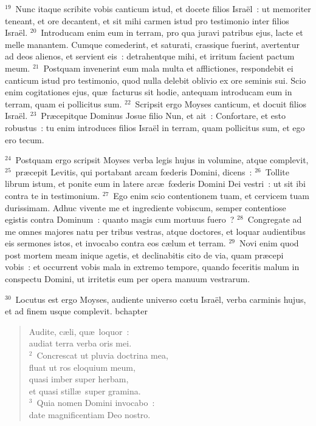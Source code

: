 ${}^{19}$~Nunc itaque scribite vobis canticum istud, et docete filios Isra\"el~: ut memoriter teneant, et ore decantent, et sit mihi carmen istud pro testimonio inter filios Isra\"el.
${}^{20}$~Introducam enim eum in terram, pro qua juravi patribus ejus, lacte et melle manantem. Cumque comederint, et saturati, crassique fuerint, avertentur ad deos alienos, et servient eis~: detrahentque mihi, et irritum facient pactum meum.
${}^{21}$~Postquam invenerint eum mala multa et afflictiones, respondebit ei canticum istud pro testimonio, quod nulla delebit oblivio ex ore seminis sui. Scio enim cogitationes ejus, qu\ae\ facturus sit hodie, antequam introducam eum in terram, quam ei pollicitus sum.
${}^{22}$~Scripsit ergo Moyses canticum, et docuit filios Isra\"el.
${}^{23}$~Pr\ae cepitque Dominus Josue filio Nun, et ait~: Confortare, et esto robustus~: tu enim introduces filios Isra\"el in terram, quam pollicitus sum, et ego ero tecum.


${}^{24}$~Postquam ergo scripsit Moyses verba legis hujus in volumine, atque complevit,
${}^{25}$~pr\ae cepit Levitis, qui portabant arcam fœderis Domini, dicens~:
${}^{26}$~Tollite librum istum, et ponite eum in latere arc\ae\ fœderis Domini Dei vestri~: ut sit ibi contra te in testimonium.
${}^{27}$~Ego enim scio contentionem tuam, et cervicem tuam durissimam. Adhuc vivente me et ingrediente vobiscum, semper contentiose egistis contra Dominum~: quanto magis cum mortuus fuero~?
${}^{28}$~Congregate ad me omnes majores natu per tribus vestras, atque doctores, et loquar audientibus eis sermones istos, et invocabo contra eos c\ae lum et terram.
${}^{29}$~Novi enim quod post mortem meam inique agetis, et declinabitis cito de via, quam pr\ae cepi vobis~: et occurrent vobis mala in extremo tempore, quando feceritis malum in conspectu Domini, ut irritetis eum per opera manuum vestrarum.


${}^{30}$~Locutus est ergo Moyses, audiente universo cœtu Isra\"el, verba carminis hujus, et ad finem usque complevit.
bchapter\begin{verse}\vspace{-19pt}Audite, c\ae li, qu\ae\ loquor~:\\ audiat terra verba oris mei.\\
${}^{2}$~Concrescat ut pluvia doctrina mea,\\ fluat ut ros eloquium meum,\\ quasi imber super herbam,\\ et quasi still\ae\ super gramina.\\
${}^{3}$~Quia nomen Domini invocabo~:\\ date magnificentiam Deo nostro.\end{verse}


